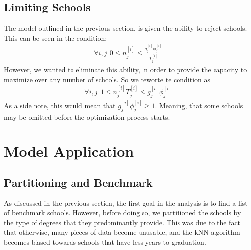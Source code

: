 \documentclass[12pt]{scrartcl}
\begin{document}
	\subsection{Limiting Schools}
		The model outlined in the previous section, is given the ability to reject schools. This can be seen in the condition:
		\begin{align*}
			\forall i,j \ \ 0\le n_j^{[i]} \le \frac{g_j^{[i]}\phi_j^{[i]}}{T_j^{[i]}}
		\end{align*}
		However, we wanted to eliminate this ability, in order to provide the capacity to maximize over any number of schools. So we reworte te condition as 
		\begin{align}
			\forall i,j \ \ 1\le n_j^{[i]}T_j^{[i]} \le g_j^{[i]}\phi_j^{[i]}
		\end{align}	
		As a side note, this would mean that $g_j^{[i]}\phi_j^{[i]}\ge1$. Meaning, that some schools may be omitted before the optimization process starts.
\section{Model Application} 
	\subsection{Partitioning and Benchmark}
		As discussed in the previous section, the first goal in the analysis is to find a list of benchmark schools. However, before doing so, we partitioned the schools by the type of degrees that they predominantly provide. This was due to the fact that otherwise, many pieces of data become unusable, and the kNN algorithm becomes biased towards schools that have less-years-to-graduation.\\ 
		\\
		\begin{figure}[H]
		\centering
		\qquad
		\end{figure}
		
\end{document}
